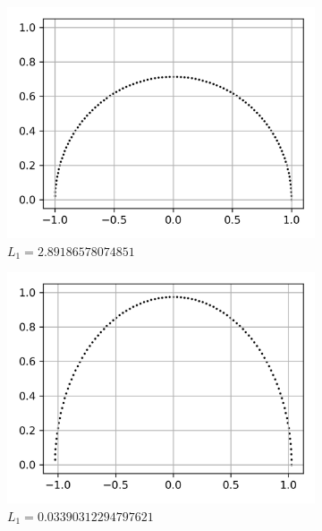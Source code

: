\documentclass[a4paper]{report}
\begin{document}
\begin{figure}[H]
    \begin{subfigure}{.33\linewidth}
      \includegraphics[width=\linewidth]{images/gd/initial_params_GD.png}
      \caption{$L_1 = 2.89186578074851$}
      \label{fig:gd_initial_params}
    \end{subfigure}\hfill
    \begin{subfigure}{.33\linewidth}
      \includegraphics[width=\linewidth]{images/gd/params_after_first_GD.png}
      \caption{$L_1 = 0.03390312294797621$}
      \label{fig:gd_after_first_run}
    \end{subfigure}\hfill
    \begin{subfigure}{.33\linewidth}

\end{subfigure}
\end{figure}
\end{document}
